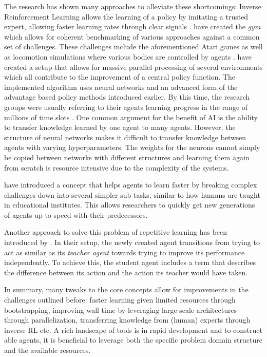 The research has shown many approaches to alleviate these shortcomings: Inverse Reinforcement Learning allows the
learning of a policy by imitating a trusted expert, allowing faster learning rates through clear signals
\citep{NG2000InvReinf}. \citet{brockman2016openai} have created the \emph{gym} which allows for coherent benchmarking of
various approaches against a common set of challenges. These challenges include the aforementioned Atari games as well
as locomotion simulations where various bodies are controlled by agents \citep{heess2017emergence}.
\citet{hafner2017agents} have created a setup that allows for massive parallel processing of several environments which
all contribute to the improvement of a central policy function. The implemented algorithm uses neural networks and an
advanced form of the advantage based policy methods introduced earlier. By this time, the research groups were usually
referring to their agents learning progress in the range of millions of time slots \citep{proximalpolicyopt}. One common
argument for the benefit of \ac{AI} is the ability to transfer knowledge learned by one agent to many agents. However, the
structure of neural networks makes it difficult to transfer knowledge between agents with varying
hyperparameters. The weights for the neurons cannot simply be copied between networks with different structures and
learning them again from scratch is resource intensive due to the complexity of the systems.

\citet{matiisen2017teacher} have introduced a concept that helps agents to learn faster by breaking complex challenges down
into several simpler sub tasks, similar to how humans are taught in educational institutes. This allows researchers to
quickly get new generations of agents up to speed with their predecessors.

Another approach to solve this problem of repetitive learning has been introduced by \citet{schmitt2018kickstarting}. In
their setup, the newly created agent transitions from trying to act as similar as its \emph{teacher agent} towards trying
to improve its performance independently. To achieve this, the student agent includes a term that describes the
difference between its action and the action its teacher would have taken.

In summary, many tweaks to the core concepts allow for improvements in the challenges outlined before: faster learning given limited
\sloppy resources through bootstrapping, improving wall time by leveraging large-scale architectures through
parallelization, transferring knowledge from (human) experts through inverse \ac{RL} etc. A rich landscape of tools is
in rapid development and to construct able agents, it is beneficial to leverage both the specific problem domain
structure and the available resources.


